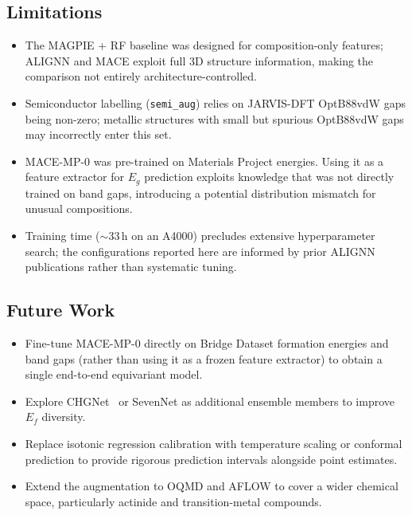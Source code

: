 \documentclass[10pt, a4paper]{article}
\begin{document}
\subsection{Limitations}

\begin{itemize}
  \item The MAGPIE + RF baseline was designed for composition-only
    features; ALIGNN and MACE exploit full 3D structure information,
    making the comparison not entirely architecture-controlled.
  \item Semiconductor labelling (\texttt{semi\_aug}) relies on
    JARVIS-DFT OptB88vdW gaps being non-zero; metallic structures
    with small but spurious OptB88vdW gaps may incorrectly enter this
    set.
  \item MACE-MP-0 was pre-trained on Materials Project energies.
    Using it as a feature extractor for $E_g$ prediction exploits
    knowledge that was not directly trained on band gaps, introducing
    a potential distribution mismatch for unusual compositions.
  \item Training time ($\sim$33\,h on an A4000) precludes
    extensive hyperparameter search; the configurations reported
    here are informed by prior ALIGNN publications rather than
    systematic tuning.
\end{itemize}

\subsection{Future Work}

\begin{itemize}
  \item Fine-tune MACE-MP-0 directly on Bridge Dataset formation
    energies and band gaps (rather than using it as a frozen feature
    extractor) to obtain a single end-to-end equivariant model.
  \item Explore CHGNet~\cite{deng2023chgnet} or SevenNet as
    additional ensemble members to improve $E_f$ diversity.
  \item Replace isotonic regression calibration with temperature
    scaling or conformal prediction to provide rigorous prediction
    intervals alongside point estimates.
  \item Extend the augmentation to OQMD and AFLOW to cover a wider
    chemical space, particularly actinide and transition-metal
    compounds.
\end{itemize}

\end{document}
